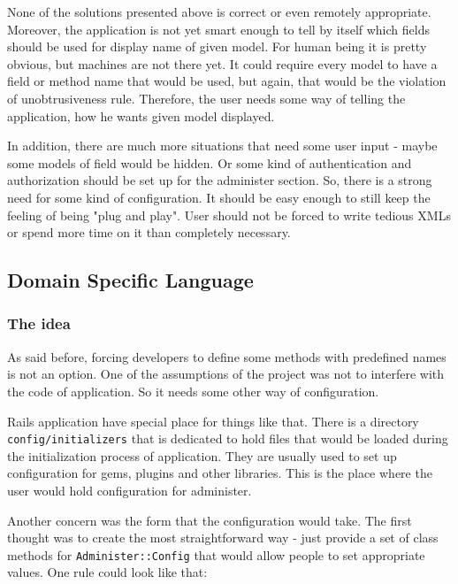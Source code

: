       None of the solutions presented above is correct or even remotely appropriate. Moreover, the application
      is not yet smart enough to tell by itself which fields should be used for display name of given model.
      For human being it is pretty obvious, but machines are not there yet.
      It could require every model to have a field or method name that would be used, but again, that would 
      be the violation of unobtrusiveness rule. Therefore, the user needs some way
      of telling the application, how he wants given model displayed.
      
      In addition, there are much more situations that need some user input - maybe some models of field would be hidden.
      Or some kind of authentication and authorization should be set up for the administer section.
      So, there is a strong need for some kind of configuration. It should be easy enough to still keep the feeling of 
      being "plug and play". User should not be forced to write tedious XMLs or spend more time on it than completely necessary.
      
    \subsection{Domain Specific Language}
      \subsubsection{The idea}
        As said before, forcing developers to define some methods with predefined names is not an option. One of 
        the assumptions of the project was not to interfere with the code of application. So it needs some other 
        way of configuration.
      
        Rails application have special place for things like that. There is a directory \texttt{config/initializers} 
        that is dedicated to hold files that would be loaded during the initialization process of application. 
        They are usually used to set up configuration for gems, plugins and other libraries. This is the place where the user
        would hold configuration for administer.
      
        Another concern was the form that the configuration would take. The first thought was to create the 
        most straightforward way - just provide a set of class methods for \texttt{Administer::Config}
        that would allow people to set appropriate values. One rule could look like that:
      
